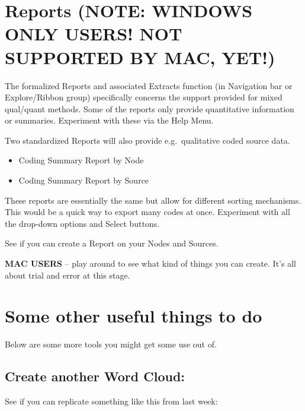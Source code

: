 \documentclass[
]{book}
\providecommand{\tightlist}{%
  \setlength{\itemsep}{0pt}\setlength{\parskip}{0pt}}
\begin{document}
\hypertarget{reports-note-windows-only-users-not-supported-by-mac-yet}{%
\section{Reports (NOTE: WINDOWS ONLY USERS! NOT SUPPORTED BY MAC, YET!)}\label{reports-note-windows-only-users-not-supported-by-mac-yet}}

The formalized Reports and associated Extracts function (in Navigation bar or Explore/Ribbon group) specifically concerns the support provided for mixed qual/quant methods. Some of the reports only provide quantitative information or summaries. Experiment with these via the Help Menu.

Two standardized Reports will also provide e.g.~qualitative coded source data.

\begin{itemize}
\tightlist
\item
  Coding Summary Report by Node
\item
  Coding Summary Report by Source
\end{itemize}

These reports are essentially the same but allow for different sorting mechanisms. This would be a quick way to export many codes at once. Experiment with all the drop-down options and Select buttons.

See if you can create a Report on your Nodes and Sources.

\textbf{MAC USERS} -- play around to see what kind of things you can create. It's all about trial and error at this stage.

\hypertarget{some-other-useful-things-to-do}{%
\section{Some other useful things to do}\label{some-other-useful-things-to-do}}

Below are some more tools you might get some use out of.

\hypertarget{create-another-word-cloud}{%
\subsection{Create another Word Cloud:}\label{create-another-word-cloud}}

See if you can replicate something like this from last week:
\end{document}
